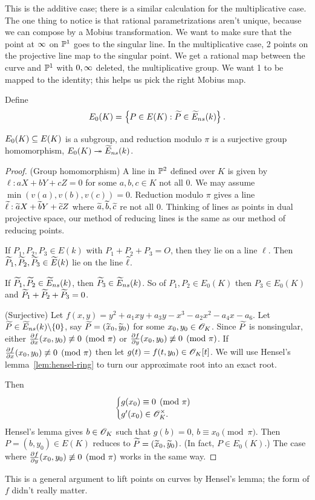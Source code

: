 This is the additive case; there is a similar calculation for the multiplicative case. The one thing to notice is that rational parametrizations aren't unique, because we can compose by a Mobius transformation. We want to make sure that the point at $\infty$ on $\mathbb{P}^1$ goes to the singular line. In the multiplicative case, 2 points on the projective line map to the singular point.
We get a rational map between the curve and $\mathbb{P}^1$ with $0,\infty$ deleted, the multiplicative group. We want 1 to be mapped to the identity; this helps us pick the right Mobius map.

\begin{df}
Define
\[
E_0(K)=\left\{{P\in E(K)}:{\widetilde{P}\in \widetilde{E}_{ns}(k)}\right\}.
\]
\end{df}
\begin{pr}
$E_0(K)\subseteq E(K)$ is a subgroup, and reduction modulo $\pi$ is a surjective group homomorphism, $E_0(K)\twoheadrightarrow \widetilde{E}_{ns}(k)$. 
\end{pr}
\begin{proof}
(Group homomorphism) A line in $\mathbb{P}^2$ defined over $K$ is given by $\ell:aX+bY+cZ=0$ for some $a,b,c\in K$ not all 0. We may assume $\min(v(a),v(b),v(c))=0$. Reduction modulo $\pi$ gives a line $\widetilde{\ell}:\widetilde{a}X+\widetilde{b}Y+\widetilde{c}Z$ where $\widetilde{a},\widetilde{b},\widetilde{c}$ re not all 0. 
Thinking of lines as points in dual projective space, our method of reducing lines is the same as our method of reducing points.

If $P_1,P_2,P_3\in E(k)$ with $P_1+P_2+P_3=O$, then they lie on a line $\ell$. Then $\widetilde{P}_1,\widetilde{P}_2,\widetilde{P}_3\in \widetilde{E}(k)$ lie on the line $\widetilde{\ell}$.

If $\widetilde{P}_1,\widetilde{P}_2\in \widetilde{E}_{ns}(k)$, then $\widetilde{P}_3\in \widetilde{E}_{ns}(k)$. So of $P_1,P_2\in E_0(K)$ then $P_3\in E_0(K)$ and $\widetilde{P}_1+\widetilde{P}_2+\widetilde{P}_3=0$.

(Surjective) Let $f(x,y)=y^2+a_1xy+a_3y-x^3-a_2x^2-a_4x-a_6$. Let $\widetilde{P}\in \widetilde{E}_{ns}(k)\backslash \{0\}$, say $\widetilde{P}=(\widetilde{x}_0,\widetilde{y}_0)$ for some $x_0,y_0\in \mathscr{O}_K$. Since $\widetilde{P}$ is nonsingular, either $\frac{\partial f}{\partial x}(x_0,y_0)\not\equiv 0\pmod{\pi}$ or $\frac{\partial f}{\partial y}(x_0,y_0)\not\equiv 0\pmod{\pi}$. If $\frac{\partial f}{\partial x}(x_0,y_0)\not\equiv 0 \pmod{\pi}$ then let $g(t)=f(t,y_0)\in \mathscr{O}_K[t]$. We will use Hensel's lemma~\ref{lem:hensel-ring} to turn our approximate root into an exact root.

Then
\[
\begin{cases}
g(x_0)\equiv 0\pmod{\pi}\\
g'(x_0)\in \mathscr{O}_K^{\times}.
\end{cases}
\]
Hensel's lemma gives $b\in \mathscr{O}_K$ such that $g(b)=0$, $b\equiv x_0\pmod{\pi}$. Then $P=(b,y_0)\in E(K)$ reduces to $\widetilde{P}=(\widetilde{x}_0,\widetilde{y}_0)$. (In fact, $P\in E_0(K)$.) The case where $\frac{\partial f}{\partial y}(x_0,y_0)\not\equiv 0\pmod{\pi}$ works in the same way.
\end{proof}
This is a general argument to lift points on curves by Hensel's lemma;  the form of $f$ didn't really matter.

